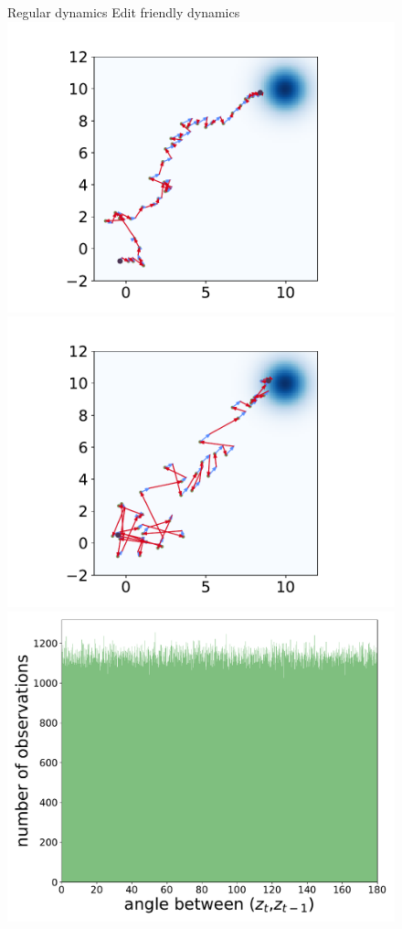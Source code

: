 \begin{figure}
\begin{center}
\hspace{0.45cm} Regular dynamics \hspace{1.1cm} Edit friendly dynamics\\
\hspace{0.2cm}\includegraphics[width=0.47\columnwidth, trim={2.2cm 0cm 2.2cm 1.2cm},clip]{ICCV23_submission/figures/native_path.pdf}
\hspace{0.2cm}\includegraphics[width=0.47\columnwidth, trim={2.2cm 0cm 2.2cm 1.2cm},clip]{ICCV23_submission/figures/our_path.pdf}
\includegraphics[width=0.49\columnwidth, trim={0cm 0cm 0cm 0.5cm},clip]{ICCV23_submission/figures/z_hist_reg.pdf}

\end{center}
\end{figure}
